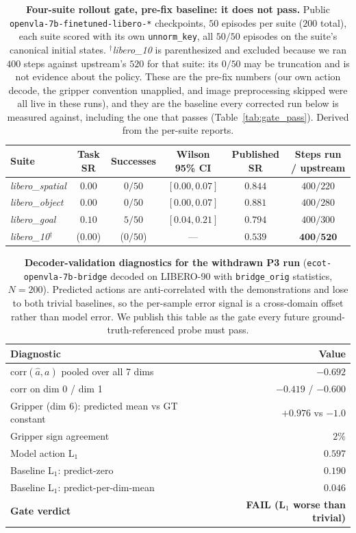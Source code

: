 \documentclass{article}
\begin{document}
\begin{table}[t]
\centering\small
\caption{\textbf{Four-suite rollout gate, pre-fix baseline: it does not pass.} Public \texttt{openvla-7b-finetuned-libero-*} checkpoints, $50$ episodes per suite ($200$ total), each suite scored with its own \texttt{unnorm\_key}, all $50/50$ episodes on the suite's canonical initial states. $^\dagger$\emph{libero\_10} is parenthesized and excluded because we ran $400$ steps against upstream's $520$ for that suite: its $0/50$ may be truncation and is not evidence about the policy. These are the pre-fix numbers (our own action decode, the gripper convention unapplied, and image preprocessing skipped were all live in these runs), and they are the baseline every corrected run below is measured against, including the one that passes (Table~\ref{tab:gate_pass}). Derived from the per-suite reports.}
\label{tab:gate}
\begin{tabular}{lccccc}
\toprule
Suite & Task SR & Successes & Wilson 95\% CI & Published SR & Steps run / upstream \\
\midrule
\emph{libero\_spatial} & $0.00$ & $0/50$ & $[0.00, 0.07]$ & $0.844$ & $400 / 220$ \\
\emph{libero\_object}  & $0.00$ & $0/50$ & $[0.00, 0.07]$ & $0.881$ & $400 / 280$ \\
\emph{libero\_goal}    & $0.10$ & $5/50$ & $[0.04, 0.21]$ & $0.794$ & $400 / 300$ \\
\emph{libero\_10}$^\dagger$ & ($0.00$) & ($0/50$) & --- & $0.539$ & $\mathbf{400 / 520}$ \\
\bottomrule
\end{tabular}
\end{table}

\begin{table}[t]
\centering\small
\caption{\textbf{Decoder-validation diagnostics for the withdrawn P3 run} (\texttt{ecot-openvla-7b-bridge} decoded on LIBERO-90 with \texttt{bridge\_orig} statistics, $N{=}200$). Predicted actions are anti-correlated with the demonstrations and lose to both trivial baselines, so the per-sample error signal is a cross-domain offset rather than model error. We publish this table as the gate every future ground-truth-referenced probe must pass.}
\label{tab:auroc}
\begin{tabular}{l r}
\toprule
Diagnostic & Value \\
\midrule
$\mathrm{corr}(\hat a, a)$ pooled over all 7 dims & $-0.692$ \\
$\mathrm{corr}$ on dim 0 / dim 1 & $-0.419$ / $-0.600$ \\
Gripper (dim 6): predicted mean vs GT constant & $+0.976$ vs $-1.0$ \\
Gripper sign agreement & $2\%$ \\
Model action L$_1$ & $0.597$ \\
Baseline L$_1$: predict-zero & $0.190$ \\
Baseline L$_1$: predict-per-dim-mean & $0.046$ \\
\midrule
\textbf{Gate verdict} & \textbf{FAIL (L$_1$ worse than trivial)} \\
\bottomrule
\end{tabular}
\end{table}
\end{document}
